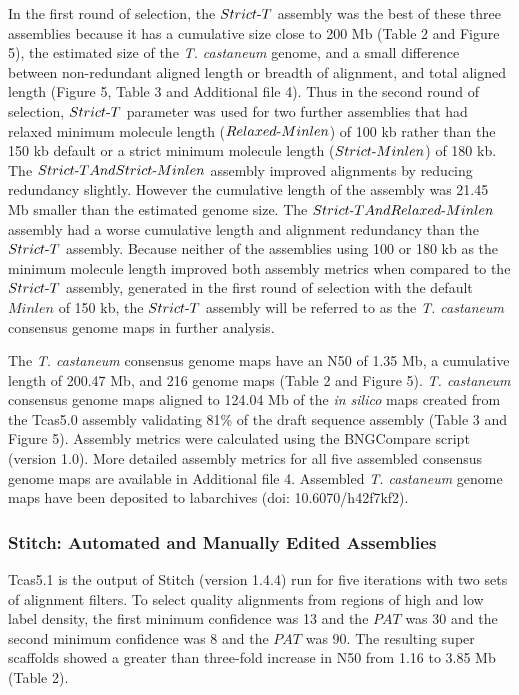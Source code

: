 \documentclass{bmcart}
\begin{document}
In the first round of selection, the $Strict\textnormal{-}T$ assembly was the best of these three assemblies because it has a cumulative size close to 200 Mb (Table 2 and Figure 5), the estimated size of the \textit{T. castaneum} genome, and a small difference between non-redundant aligned length or breadth of alignment, and total aligned length (Figure 5, Table 3 and Additional file 4). Thus in the second round of selection, $Strict\textnormal{-}T$ parameter was used for two further assemblies that had relaxed minimum molecule length ($Relaxed\textnormal{-}Minlen$) of 100 kb rather than the 150 kb default or a strict minimum molecule length ($Strict\textnormal{-}Minlen$) of 180 kb. The $Strict\textnormal{-}TAndStrict\textnormal{-}Minlen$ assembly improved alignments by reducing redundancy slightly. However the cumulative length of the assembly was 21.45 Mb smaller than the estimated genome size. The $Strict\textnormal{-}TAndRelaxed\textnormal{-}Minlen$ assembly had a worse cumulative length and alignment redundancy than the $Strict\textnormal{-}T$ assembly. Because neither of the assemblies using 100 or 180 kb as the minimum molecule length improved both assembly metrics when compared to the $Strict\textnormal{-}T$ assembly, generated in the first round of selection with the default $Minlen$ of 150 kb, the $Strict\textnormal{-}T$ assembly will be referred to as the \textit{T. castaneum} consensus genome maps in further analysis.


The \textit{T. castaneum} consensus genome maps have an N50 of 1.35 Mb, a cumulative length of 200.47 Mb, and 216 genome maps (Table 2 and Figure 5). \textit{T. castaneum} consensus genome maps aligned to 124.04 Mb of the \textit{in silico} maps created from the Tcas5.0 assembly validating 81\% of the draft sequence assembly (Table 3 and Figure 5). Assembly metrics were calculated using the BNGCompare script (version 1.0). More detailed assembly metrics for all five assembled consensus genome maps are available in Additional file 4. Assembled \textit{T. castaneum} genome maps have been deposited to labarchives (doi: 10.6070/h42f7kf2).

\subsubsection*{Stitch: Automated and Manually Edited Assemblies}


Tcas5.1 is the output of Stitch (version 1.4.4) run for five iterations with two sets of alignment filters. To select quality alignments from regions of high and low label density, the first minimum confidence was 13 and the $PAT$ was 30 and the second minimum confidence was 8 and the $PAT$ was 90. The resulting super scaffolds showed a greater than three-fold increase in N50 from 1.16 to 3.85 Mb (Table 2). 
\end{document}
